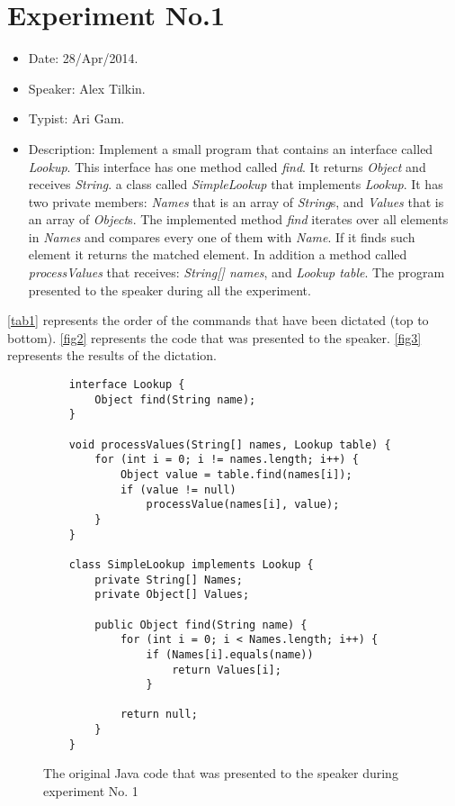\section{Experiment No.1}
\begin{itemize}
	\item Date: 28/Apr/2014.
	\item Speaker: Alex Tilkin.
	\item Typist: Ari Gam.
	\item Description: Implement a small program that contains an interface called \textit{Lookup}. This interface has one method called \textit{find}. It returns \textit{Object} and receives \textit{String}. a class called \textit{SimpleLookup} that implements \textit{Lookup}. It has two private members: \textit{Names} that is an array of \textit{String}s, and \textit{Values} that is an array of \textit{Object}s. The implemented method \textit{find} iterates over all elements in \textit{Names} and compares every one of them with \textit{Name}. If it finds such element it returns the matched element. In addition a method called \textit{processValues} that receives: \textit{String[] names}, and \textit{Lookup table}. The program presented to the speaker during all the experiment.
\end{itemize}
\autoref{tab1} represents the order of the commands that have been dictated (top to bottom). \autoref{fig2} represents the code that was presented to the speaker. \autoref{fig3} represents the results of the dictation.
\begin{figure}[H]
	\begin{lstlisting}
	interface Lookup {
		Object find(String name);
	}
	
	void processValues(String[] names, Lookup table) {
		for (int i = 0; i != names.length; i++) {
			Object value = table.find(names[i]); 
			if (value != null)
				processValue(names[i], value); 
		}
	}
	
	class SimpleLookup implements Lookup {
		private String[] Names;
		private Object[] Values;
		
		public Object find(String name) {
			for (int i = 0; i < Names.length; i++) {
				if (Names[i].equals(name)) 
					return Values[i]; 
				}
				
			return null;
		}
	}
	\end{lstlisting}
	\caption{The original Java code that was presented to the speaker during experiment No. 1}
	\label{fig2}
\end{figure}
